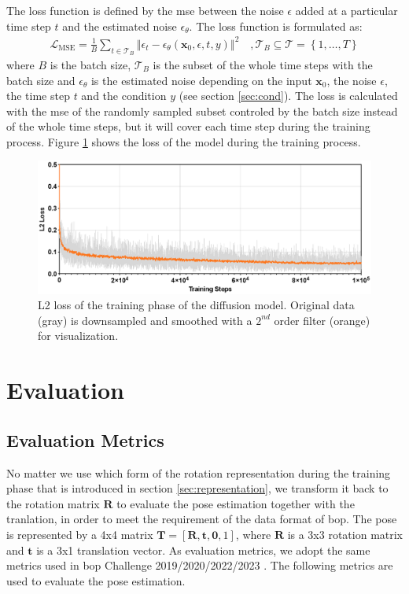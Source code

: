 \documentclass[12pt,DIV14,BCOR12mm,a4paper,footinclude=false,headinclude,parskip=half-,twoside,openright,cleardoublepage=empty,toc=index,bibliography=totoc,listof=totoc]{scrreprt}
\numberwithin{equation}{chapter}
\begin{document}
The loss function is defined by the \gls{mse} between the noise $\epsilon$ added at a particular time step $t$ and the estimated noise $\epsilon_{\theta}$. The loss function is formulated as:
\begin{align}
  \mathcal{L}_{\text{MSE}}=\frac{1}{B}\sum_{t\in \mathcal{T}_{B} }\left\Vert \epsilon_{t}-\epsilon_{\theta}(\mathbf{x}_{0},\epsilon, t, y)\right\Vert^{2} \quad , \mathcal{T}_{B}\subseteq \mathcal{T}=\left\{1,\dots,T\right\}
\end{align}
where $B$ is the batch size, $\mathcal{T}_{B}$ is the subset of the whole time steps with the batch size and $\epsilon_{\theta}$ is the estimated noise depending on the input $\mathbf{x}_{0}$, the noise $\epsilon$, the time step $t$ and the condition $y$ (see section \ref{sec:cond}). The loss is calculated with the \gls{mse} of the randomly sampled subset controled by the batch size instead of the whole time steps, but it will cover each time step during the training process. Figure \ref{img:diff_loss} shows the loss of the model during the training process.

\begin{figure}[h]
	\centering
	\includegraphics[width=1.\textwidth]{img/diff_loss.eps}
	\caption{L2 loss of the training phase of the diffusion model. Original data (gray) is downsampled and smoothed with a $2^{nd}$ order filter (orange) for visualization. }
	\label{img:diff_loss}
\end{figure}

\section{Evaluation}
\subsection{Evaluation Metrics}
No matter we use which form of the rotation representation during the training phase that is introduced in section \ref{sec:representation}, we transform it back to the rotation matrix $\mathbf{R}$ to evaluate the pose estimation together with the tranlation, in order to meet the requirement of the data format of \gls{bop}. The pose is represented by a 4x4 matrix $\mathbf{T}=[\mathbf{R},\mathbf{t},\mathbf{0},1]$, where $\mathbf{R}$ is a 3x3 rotation matrix and $\mathbf{t}$ is a 3x1 translation vector. As evaluation metrics, we adopt the same metrics used in \gls{bop} Challenge 2019/2020/2022/2023 \cite{hodan2018bop,hodan2020bop}. The following metrics are used to evaluate the pose estimation. 
\end{document}
